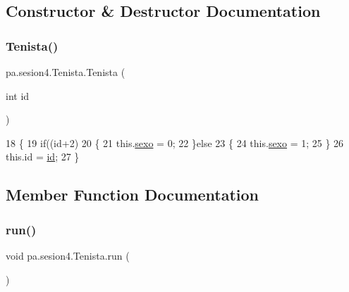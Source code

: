 \subsection{Constructor \& Destructor Documentation}
\mbox{\label{classpa_1_1sesion4_1_1_tenista_ade44ec1b8a3bd722846ed25c6f1262c7}} 
\subsubsection{\texorpdfstring{Tenista()}{Tenista()}}
{\footnotesize\ttfamily pa.\+sesion4.\+Tenista.\+Tenista (\begin{DoxyParamCaption}\item[{int}]{id }\end{DoxyParamCaption})\hspace{0.3cm}{\ttfamily [inline]}}


\begin{DoxyCode}
18     \{
19         \textcolor{keywordflow}{if}((\textcolor{keywordtype}{id}+2)%
20         \{
21             this.\mbox{\hyperlink{classpa_1_1sesion4_1_1_tenista_aabbd7677d3913d001386bb318ec9f1d1}{sexo}} = 0; 
22         \}\textcolor{keywordflow}{else}
23         \{
24             this.\mbox{\hyperlink{classpa_1_1sesion4_1_1_tenista_aabbd7677d3913d001386bb318ec9f1d1}{sexo}} = 1;
25         \}
26         this.\textcolor{keywordtype}{id} = \mbox{\hyperlink{classpa_1_1sesion4_1_1_tenista_aa1cefb7bce1731c6a8cb44a98759c9af}{id}};
27     \}
\end{DoxyCode}


\subsection{Member Function Documentation}
\mbox{\label{classpa_1_1sesion4_1_1_tenista_aaa08c6a87cb2c514484b7fd1ed829a13}} 
\subsubsection{\texorpdfstring{run()}{run()}}
{\footnotesize\ttfamily void pa.\+sesion4.\+Tenista.\+run (\begin{DoxyParamCaption}{ }\end{DoxyParamCaption})\hspace{0.3cm}{\ttfamily [inline]}}


